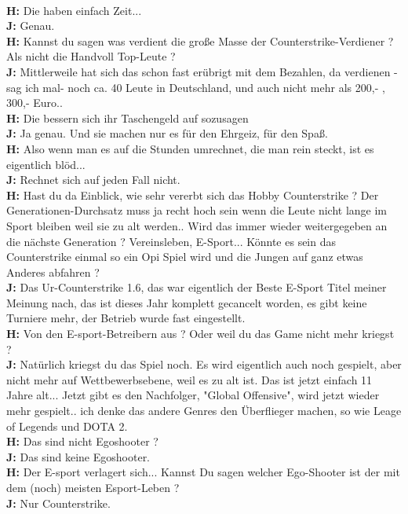 \\ \textbf{H:} Die haben einfach Zeit...
\\ \textbf{J:} Genau.
\\ \textbf{H:} Kannst du sagen was verdient die große Masse der Counterstrike-Verdiener ? Als nicht die Handvoll Top-Leute ?
\\ \textbf{J:} Mittlerweile hat sich das schon fast erübrigt mit dem Bezahlen, da verdienen -sag ich mal- noch ca. 40 Leute in Deutschland, und auch nicht mehr als 200,- , 300,- Euro..
\\ \textbf{H:} Die bessern sich ihr Taschengeld auf sozusagen
\\ \textbf{J:} Ja genau. Und sie machen nur es für den Ehrgeiz, für den Spaß.
\\ \textbf{H:} Also wenn man es auf die Stunden umrechnet, die man rein steckt, ist es eigentlich blöd...
\\ \textbf{J:} Rechnet sich auf jeden Fall nicht.
\\ \textbf{H:} Hast du da Einblick, wie sehr vererbt sich das Hobby Counterstrike ? Der  Generationen-Durchsatz muss ja recht hoch sein wenn die Leute nicht lange im Sport bleiben weil sie zu alt werden.. Wird das immer wieder weitergegeben an die nächste Generation ? Vereinsleben, E-Sport... Könnte es sein das Counterstrike einmal so ein Opi Spiel wird und die Jungen auf ganz etwas Anderes abfahren ?
\\ \textbf{J:} Das Ur-Counterstrike 1.6, das war eigentlich der Beste E-Sport Titel meiner Meinung nach, das ist dieses Jahr komplett gecancelt worden, es gibt keine Turniere mehr, der Betrieb wurde fast eingestellt.
\\ \textbf{H:} Von den E-sport-Betreibern aus ? Oder weil du das Game nicht mehr kriegst ?
\\ \textbf{J:} Natürlich kriegst du das Spiel noch. Es wird eigentlich auch noch gespielt, aber nicht mehr auf Wettbewerbsebene, weil es zu alt ist. Das ist jetzt einfach 11 Jahre alt... Jetzt gibt es den Nachfolger, "Global Offensive", wird jetzt wieder mehr gespielt.. ich denke das andere Genres den Überflieger machen, so wie Leage of Legends und DOTA 2.
\\ \textbf{H:} Das sind nicht Egoshooter ?
\\ \textbf{J:} Das sind keine Egoshooter.
\\ \textbf{H:} Der E-sport verlagert sich... Kannst Du sagen welcher Ego-Shooter ist der mit dem (noch) meisten Esport-Leben ?
\\ \textbf{J:} Nur Counterstrike.
